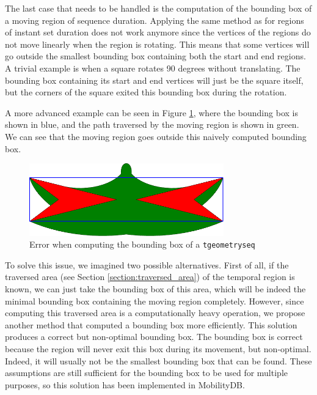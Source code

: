 The last case that needs to be handled is the computation of the bounding box of a moving region of sequence duration. Applying the same method as for regions of instant set duration does not work anymore since the vertices of the regions do not move linearly when the region is rotating. This means that some vertices will go outside the smallest bounding box containing both the start and end regions. A trivial example is when a square rotates 90 degrees without translating. The bounding box containing its start and end vertices will just be the square itself, but the corners of the square exited this bounding box during the rotation. 

A more advanced example can be seen in Figure \ref{fig:naive_bbox_error}, where the bounding box is shown in blue, and the path traversed by the moving region is shown in green. We can see that the moving region goes outside this naively computed bounding box.

\begin{figure}[h!]
    \centering
    \includegraphics[width=0.75\textwidth]{images/naive_bbox_error.pdf}
    \caption{Error when computing the bounding box of a \lstinline+tgeometryseq+}
    \label{fig:naive_bbox_error}
\end{figure}

To solve this issue, we imagined two possible alternatives. First of all, if the traversed area (see Section \ref{section:traversed_area}) of the temporal region is known, we can just take the bounding box of this area, which will be indeed the minimal bounding box containing the moving region completely. However, since computing this traversed area is a computationally heavy operation, we propose another method that computed a bounding box more efficiently. This solution produces a correct but non-optimal bounding box. The bounding box is correct because the region will never exit this box during its movement, but non-optimal. Indeed, it will usually not be the smallest bounding box that can be found. These assumptions are still sufficient for the bounding box to be used for multiple purposes, so this solution has been implemented in MobilityDB.

